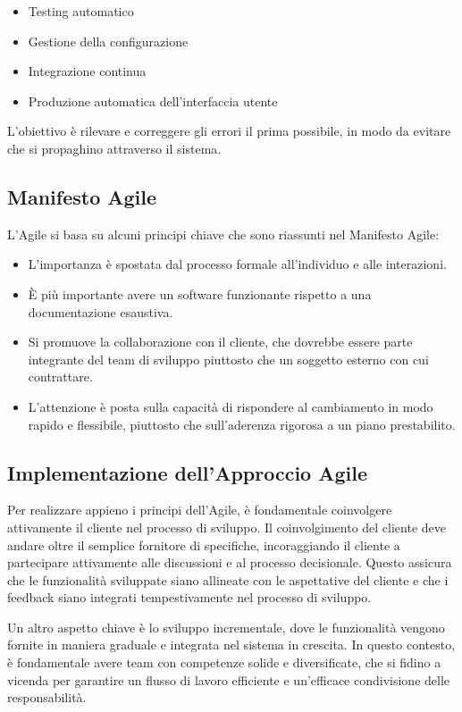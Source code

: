 \begin{itemize}
    \item Testing automatico
    \item Gestione della configurazione
    \item Integrazione continua
    \item Produzione automatica dell'interfaccia utente
\end{itemize}

L'obiettivo è rilevare e correggere gli errori il prima possibile, in modo da evitare che si propaghino attraverso il sistema.

\subsection{Manifesto Agile}
L'Agile si basa su alcuni principi chiave che sono riassunti nel Manifesto Agile:

\begin{itemize}
    \item L'importanza è spostata dal processo formale all'individuo e alle interazioni.
    \item È più importante avere un software funzionante rispetto a una documentazione esaustiva.
    \item Si promuove la collaborazione con il cliente, che dovrebbe essere parte integrante del team di sviluppo piuttosto che
    un soggetto esterno con cui contrattare.
    \item L'attenzione è posta sulla capacità di rispondere al cambiamento in modo rapido e flessibile, piuttosto che
    sull'aderenza rigorosa a un piano prestabilito.
\end{itemize}

\subsection{Implementazione dell'Approccio Agile}
Per realizzare appieno i principi dell'Agile, è fondamentale coinvolgere attivamente il cliente nel processo di sviluppo.
Il coinvolgimento del cliente deve andare oltre il semplice fornitore di specifiche, incoraggiando il cliente a partecipare
attivamente alle discussioni e al processo decisionale. Questo assicura che le funzionalità sviluppate siano allineate con
le aspettative del cliente e che i feedback siano integrati tempestivamente nel processo di sviluppo.

Un altro aspetto chiave è lo sviluppo incrementale, dove le funzionalità vengono fornite in maniera graduale e integrata
nel sistema in crescita. In questo contesto, è fondamentale avere team con competenze solide e diversificate, che si fidino
a vicenda per garantire un flusso di lavoro efficiente e un'efficace condivisione delle responsabilità.

